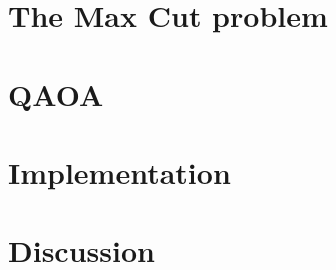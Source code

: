 \documentclass[a4paper]{report}
\begin{document}
    
    \tableofcontents
\chapter{The Max Cut problem}
    
\chapter{QAOA}
    
\chapter{Implementation}
    
%    
\chapter{Discussion}
    


\printbibliography
%
\end{document}
